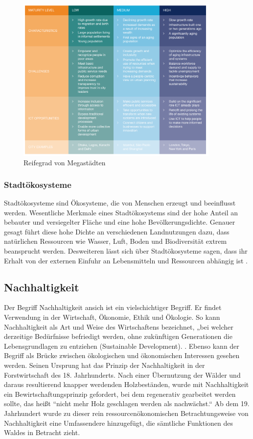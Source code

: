 \documentclass{article}
\begin{document}
\begin{figure}[h]
\centering
\includegraphics[width=10cm]{image_folder/urban_reifegrad.png}
\caption{Reifegrad von Megastädten}
\label{figUrbanRf}
\end{figure}

\subsubsection{Stadtökosysteme}
Stadtökosysteme sind Ökosysteme, die von Menschen erzeugt und beeinflusst werden. Wesentliche Merkmale eines Stadtökosystems sind der hohe Anteil an bebauter und versiegelter Fläche und eine hohe Bevölkerungsdichte. Genauer gesagt führt diese hohe Dichte an verschiedenen Landnutzungen dazu, dass natürlichen Ressourcen wie Wasser, Luft, Boden und Biodiversität extrem beansprucht werden. Desweiteren lässt sich über Stadtökosysteme sagen, dass ihr Erhalt von der externen Einfuhr an Lebensmitteln und Ressourcen abhängig ist  \cite[S.61]{Breuste2016Stadtokosysteme}.


\subsection{Nachhaltigkeit}

Der Begriff Nachhaltigkeit ansich ist ein vielschichtiger Begriff. Er findet Verwendung in der Wirtschaft, Ökonomie, Ethik und Ökologie. So kann Nachhaltigkeit als Art und Weise des Wirtschaftens bezeichnet, „bei welcher derzeitige Bedürfnisse befriedigt werden, ohne zukünftigen Generationen die Lebensgrundlagen zu entziehen (Sustainable Development). \cite{DefinitionWirtschaftslexikonb}. Ebenso kann der Begriff als Brücke zwischen ökologischen und ökonomischen Interessen gesehen werden. Seinen Ursprung hat das Prinzip der Nachhaltigkeit in der Forstwirtschaft des 18. Jahrhunderts. Nach einer Übernutzung der Wälder und daraus resultierend knapper werdenden Holzbeständen, wurde mit Nachhaltigkeit ein Bewirtschaftungsprinzip gefordert, bei dem regenerativ gearbeitet werden sollte, das heißt “nicht mehr Holz geschlagen werden als nachwächst.“\cite{NachhaltigeBrockhaus.de}
Ab dem 19. Jahrhundert wurde zu dieser rein ressourcenökonomischen Betrachtungsweise von Nachhaltigkeit eine Umfassendere hinzugefügt, die sämtliche Funktionen des Waldes in Betracht zieht.
\end{document}
